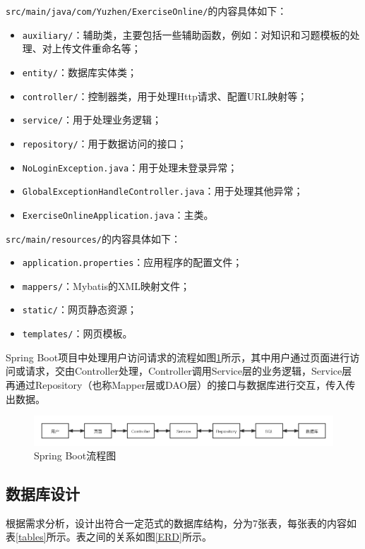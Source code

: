 \documentclass{nwafucoursepaper}
\begin{document}
\verb|src/main/java/com/Yuzhen/ExerciseOnline/|的内容具体如下：
\begin{itemize}
    \item \verb|auxiliary/|：辅助类，主要包括一些辅助函数，例如：对知识和习题模板的处理、对上传文件重命名等；
    \item \verb|entity/|：数据库实体类；
    \item \verb|controller/|：控制器类，用于处理Http请求、配置URL映射等；
    \item \verb|service/|：用于处理业务逻辑；
    \item \verb|repository/|：用于数据访问的接口；
    \item \verb|NoLoginException.java|：用于处理未登录异常；
    \item \verb|GlobalExceptionHandleController.java|：用于处理其他异常；
    \item \verb|ExerciseOnlineApplication.java|：主类。
\end{itemize}

\verb|src/main/resources/|的内容具体如下：
\begin{itemize}
    \item \verb|application.properties|：应用程序的配置文件；
    \item \verb|mappers/|：Mybatis的XML映射文件；
    \item \verb|static/|：网页静态资源；
    \item \verb|templates/|：网页模板。
\end{itemize}

Spring Boot项目中处理用户访问请求的流程如图\ref{Spring Boot流程图}所示，其中用户通过页面进行访问或请求，交由Controller处理，Controller调用Service层的业务逻辑，Service层再通过Repository（也称Mapper层或DAO层）的接口与数据库进行交互，传入传出数据。

\begin{figure}[htp]
  \centering
  \includegraphics[width=\textwidth]{springboot.png}
  \caption{Spring Boot流程图}
  \label{Spring Boot流程图}
\end{figure}

\subsection{数据库设计}

根据需求分析，设计出符合一定范式的数据库结构，分为7张表，每张表的内容如表\ref{tables}所示。表之间的关系如图\ref{ERD}所示。
\end{document}
